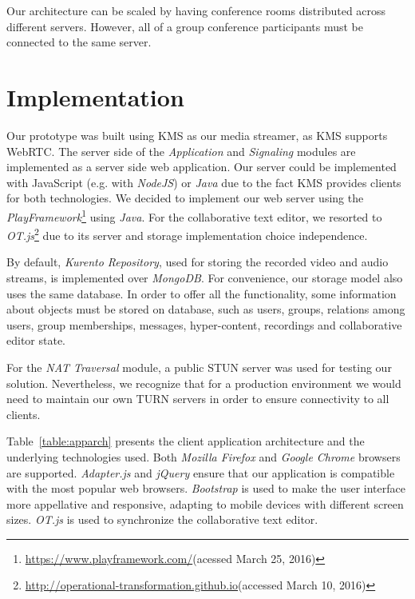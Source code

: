 \documentclass[10pt,conference]{IEEEtran}
\begin{document}
Our architecture can be scaled by having conference rooms distributed across different servers.
However, all of a group conference participants must be connected to the same server.


\section{Implementation}
\label{chapter:implementation}


Our prototype was built using \gls{KMS} as our media streamer, as \gls{KMS} supports \gls{WebRTC}.
The server side of the \emph{Application} and \emph{Signaling} modules are implemented as a server side web application. 
Our server could be implemented with JavaScript (e.g. with \emph{NodeJS}) or \emph{Java} due to the fact \gls{KMS} provides clients for both technologies. 
We decided to implement our web server using the \emph{PlayFramework}\footnote{\url{https://www.playframework.com/}(acessed March 25, 2016)} using \emph{Java}.
For the collaborative text editor, we resorted to \emph{OT.js}\footnote{\url{http://operational-transformation.github.io}(accessed March 10, 2016)} due to its server and storage implementation choice independence.

By default, \emph{Kurento Repository}, used for storing the recorded video and audio streams, is implemented over \emph{MongoDB}.
For convenience, our storage model also uses the same database.
In order to offer all the functionality, some information about objects must be stored on database, such as users, groups, relations among users, group memberships, messages, hyper-content, recordings and collaborative editor state. 


For the \emph{NAT Traversal} module, a public \gls{STUN} server was used for testing our solution.
Nevertheless, we recognize that for a production environment we would need to maintain our own \gls{TURN} servers in order to ensure connectivity to all clients.




Table~\ref{table:apparch} presents the client application architecture and the underlying technologies used.
Both \emph{Mozilla Firefox} and \emph{Google Chrome} browsers are supported.
\emph{Adapter.js} and \emph{jQuery} ensure that our application is compatible with the most popular web browsers.
\emph{Bootstrap} is used to make the user interface more appellative and responsive, adapting to mobile devices with different screen sizes.
\emph{OT.js} is used to synchronize the collaborative text editor.
\end{document}
